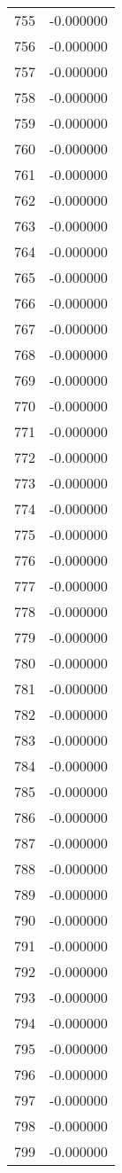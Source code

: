 \documentclass[12pt]{article}
\begin{document}
\begin{longtable}{@{}cc@{}}
755 & -0.000000 \\
756 & -0.000000 \\
757 & -0.000000 \\
758 & -0.000000 \\
759 & -0.000000 \\
760 & -0.000000 \\
761 & -0.000000 \\
762 & -0.000000 \\
763 & -0.000000 \\
764 & -0.000000 \\
765 & -0.000000 \\
766 & -0.000000 \\
767 & -0.000000 \\
768 & -0.000000 \\
769 & -0.000000 \\
770 & -0.000000 \\
771 & -0.000000 \\
772 & -0.000000 \\
773 & -0.000000 \\
774 & -0.000000 \\
775 & -0.000000 \\
776 & -0.000000 \\
777 & -0.000000 \\
778 & -0.000000 \\
779 & -0.000000 \\
780 & -0.000000 \\
781 & -0.000000 \\
782 & -0.000000 \\
783 & -0.000000 \\
784 & -0.000000 \\
785 & -0.000000 \\
786 & -0.000000 \\
787 & -0.000000 \\
788 & -0.000000 \\
789 & -0.000000 \\
790 & -0.000000 \\
791 & -0.000000 \\
792 & -0.000000 \\
793 & -0.000000 \\
794 & -0.000000 \\
795 & -0.000000 \\
796 & -0.000000 \\
797 & -0.000000 \\
798 & -0.000000 \\
799 & -0.000000 \\

\end{longtable}
\end{document}
